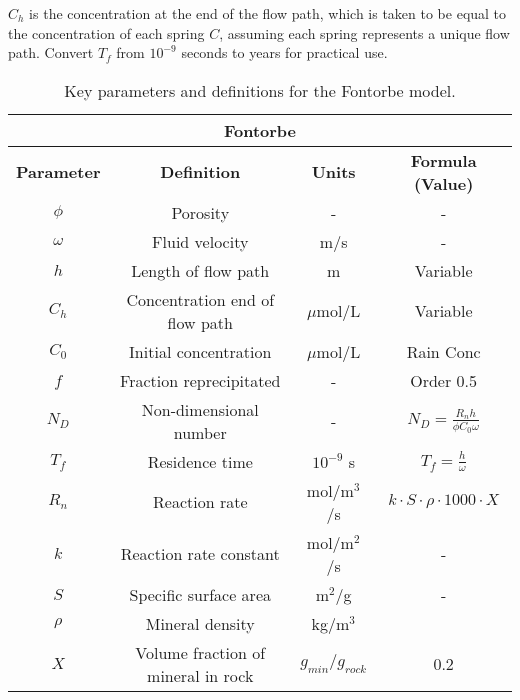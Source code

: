 \begin{tcolorbox}
{\begin{multicols}{2}
\end{multicols}
    
$C_h$ is the concentration at the end of the flow path, which is taken to be equal to the concentration of each spring $C$, assuming each spring represents a unique flow path. Convert \(T_f\) from \(10^{-9}\) seconds to years for practical use. 

\begin{table}[H]
    \centering
    \begin{tabular}{|c|c|c|c|}
        \hline
        \multicolumn{4}{|c|}{\textbf{Fontorbe}} \\  
        \hline
        \textbf{Parameter} & \textbf{Definition} & \textbf{Units} & \textbf{Formula (Value)} \\  
        \hline
        $\phi$ & Porosity & - & - \\
        $\omega$ & Fluid velocity & m/s & - \\
        $h$ & Length of flow path & m & Variable \\
        $C_h$ & Concentration \@ end of flow path & $\mu$mol/L & Variable \\
        $C_0$ & Initial concentration & $\mu$mol/L & Rain Conc \\
        $f$ & Fraction reprecipitated & - & Order 0.5 \\
        $N_D$ & Non-dimensional number & - & $N_D = \frac{R_n h}{\phi C_0 \omega}$ \\
        $T_f$ & Residence time & $10^{-9}$ s & $T_f = \frac{h}{\omega}$ \\
        $R_n$ & Reaction rate & mol/m$^3$/s & $k\cdot S \cdot \rho \cdot 1000 \cdot X  $ \\
        $k$ & Reaction rate constant & mol/m$^2$/s & - \\
        $S$ & Specific surface area & m$^2$/g & - \\
        $\rho$ & Mineral density & kg/m$^3$ &  \\
        $X$ & Volume fraction of mineral in rock & $g_{min}/g_{rock}$ & 0.2 \\
        \hline
    \end{tabular}
    \caption{Key parameters and definitions for the Fontorbe model.}
    \label{tab:parameters1}
\end{table}
    
}

\end{tcolorbox}


